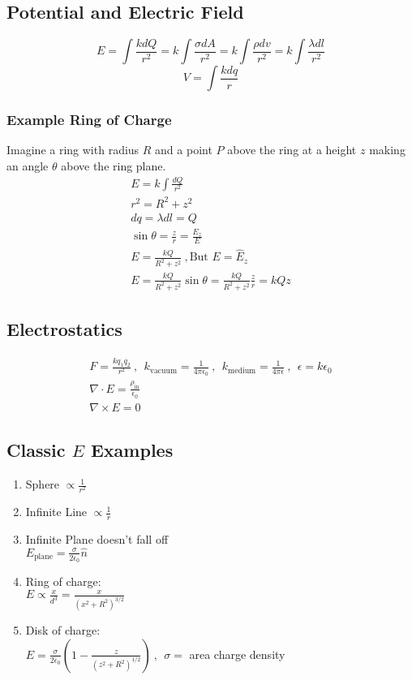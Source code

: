 \documentclass[10pt,a4paper]{article}
\begin{document}
\subsection{Potential and Electric Field}
\begin{equation}
 E = \int \frac{kdQ}{r^2} = k\int\frac{\sigma dA}{r^2} = k\int \frac{\rho dv}{r^2} = k\int \frac{\lambda dl}{r^2}
\end{equation}
\begin{equation}
 V = \int \frac{kdq}{r}
\end{equation}

\subsubsection{Example Ring of Charge}
Imagine a ring with radius $R$ and a point $P$ above the ring at a height $z$ making an angle $\theta$ above the ring plane.
\begin{align}
 E = k\int \frac{dQ}{r^2}\\
 r^2 = R^2 + z^2\\
 dq = \lambda dl = Q\\
 \sin \theta = \frac{z}{r} = \frac{E_z}{E}\\
 E = \frac{kQ}{R^2 + z^2}~,\textrm{But }E = \hat{E}_z\\
 E = \frac{kQ}{R^2 + z^2}\sin\theta = \frac{kQ}{R^2 + z^2}\frac{z}{r} = kQz
\end{align}

\subsection{Electrostatics}
\begin{align}
 F = \frac{kq_1q_2}{r^2} ~,~~k_{\textrm{vacuum}}=\frac{1}{4\pi\epsilon_0}~,~~k_{\textrm{medium}}=\frac{1}{4\pi\epsilon}~,~~\epsilon = k \epsilon_0\\
 \nabla \cdot E = \frac{\rho_{\textrm{in}}}{\epsilon_0}\\
 \nabla \times E = 0
\end{align}

\subsection{Classic $E$ Examples}
\begin{enumerate}
    \item  Sphere $\propto \frac{1}{r^2}$
    \item Infinite Line $\propto \frac{1}{r}$
    \item Infinite Plane doesn't fall off\\
        $E_{\textrm{plane}} = \frac{\sigma}{2 \epsilon_0} \hat{n}$
    \item Ring of charge:\\
    $E \propto \frac{x}{d^3} = \frac{x}{(x^2 + R^2)^{3/2}}$
    \item Disk of charge:\\
    $E = \frac{\sigma}{2\epsilon_0} \left( 1 - \frac{z}{(z^2 + R^2)^{1/2}} \right) ~,~~\sigma =$ area charge density
\end{enumerate}
\end{document}
